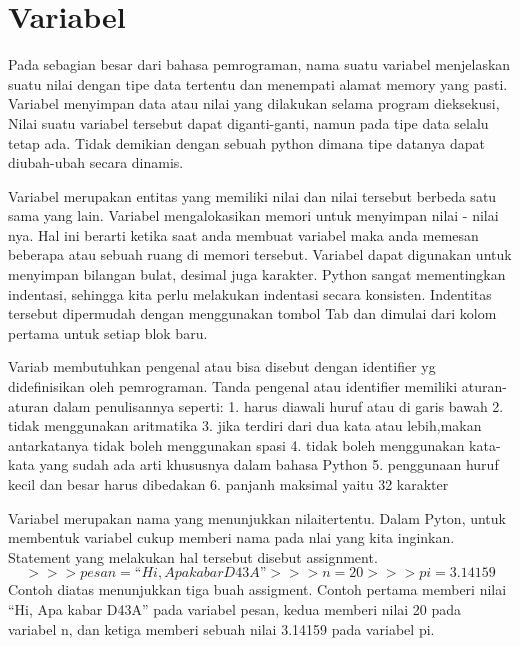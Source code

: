 
\section{Variabel}
Pada sebagian besar dari bahasa pemrograman, nama suatu variabel
menjelaskan suatu nilai dengan tipe data tertentu 
dan menempati alamat memory yang pasti.
Variabel menyimpan data atau nilai yang dilakukan selama program dieksekusi,
Nilai suatu variabel tersebut dapat diganti-ganti, namun pada tipe data selalu tetap ada.
Tidak demikian dengan sebuah python dimana tipe datanya dapat diubah-ubah
secara dinamis\cite{suparno2013komputasi}.

Variabel merupakan entitas yang memiliki nilai dan nilai tersebut berbeda satu sama yang lain. Variabel mengalokasikan memori untuk menyimpan nilai - nilai nya.
Hal ini berarti ketika saat anda membuat variabel maka anda memesan beberapa atau sebuah ruang di memori tersebut. 
Variabel dapat digunakan untuk menyimpan bilangan bulat, desimal juga karakter.
Python sangat mementingkan indentasi, sehingga kita perlu melakukan indentasi secara konsisten. 
Indentitas tersebut dipermudah dengan menggunakan tombol Tab dan dimulai dari kolom pertama untuk setiap blok baru.

Variab membutuhkan pengenal atau bisa disebut dengan identifier yg didefinisikan oleh pemrograman. Tanda pengenal atau identifier memiliki aturan-aturan dalam penulisannya seperti:
1. harus diawali huruf atau di garis bawah
2. tidak menggunakan aritmatika
3. jika terdiri dari dua kata atau lebih,makan antarkatanya tidak boleh menggunakan spasi
4. tidak boleh menggunakan kata-kata yang sudah ada arti khususnya dalam bahasa Python
5. penggunaan huruf kecil dan besar harus dibedakan
6. panjanh maksimal yaitu 32 karakter

Variabel merupakan nama yang menunjukkan nilaitertentu. Dalam Pyton, untuk membentuk variabel cukup memberi nama pada nlai yang kita inginkan. Statement yang melakukan hal tersebut disebut assignment.
\begin{equation}
>>> pesan = “Hi, Apa kabar D43A”
>>> n = 20
>>> pi = 3.14159
\end{equation}
Contoh diatas menunjukkan tiga buah assigment. Contoh pertama memberi nilai “Hi, Apa kabar D43A” pada variabel pesan, kedua memberi nilai 20 pada variabel n, dan ketiga memberi sebuah nilai 3.14159 pada variabel pi.\cite{utami2004logika}


